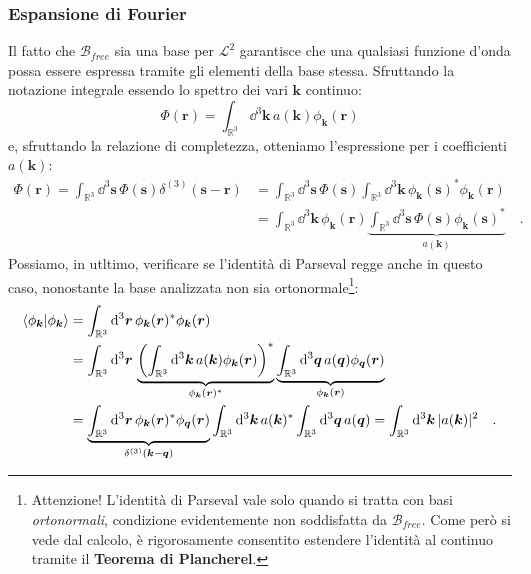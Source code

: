 \subsubsection{Espansione di Fourier}
Il fatto che $\mathcal{B}_{free}$ sia una base per $\mathcal{L}^2$ garantisce che una qualsiasi funzione d'onda possa essere espressa tramite gli elementi della base stessa. Sfruttando la notazione integrale essendo lo spettro dei vari $\bm{k}$ continuo:
\[
    \Phi(\bm{r}) = \int_{\mathbb{R}^3} \dd^3{\bm{k}} \, a(\bm{k})\phi_{\bm{k}}(\bm{r})
\]
e, sfruttando la relazione di completezza, otteniamo l'espressione per i coefficienti $a(\bm{k})$:
\[
    \begin{aligned}
        \Phi(\bm{r}) = \int_{\mathbb{R}^3} \dd^3{\bm{s}} \, \Phi(\bm{s}) \delta^{(3)}{(\bm{s}-\bm{r})} &= \int_{\mathbb{R}^3} \dd^3{\bm{s}} \, \Phi(\bm{s}) \int_{\mathbb{R}^3} \dd^3{\bm{k}} \, \phi_{\bm{k}}(\bm{s})^*\phi_{\bm{k}}(\bm{r}) \\
        &= \int_{\mathbb{R}^3} \dd^3{\bm{k}} \, \phi_{\bm{k}}(\bm{r}) \underbrace{\int_{\mathbb{R}^3} \dd^3{\bm{s}} \, \Phi(\bm{s}) \phi_{\bm{k}}(\bm{s})^*}_{a(\bm{k})} \quad.
        \end{aligned}
\]
Possiamo, in utltimo, verificare se l'identità di Parseval regge anche in questo caso, nonostante la base analizzata non sia ortonormale\footnote{Attenzione! L'identità di Parseval vale solo quando si tratta con basi \emph{ortonormali}, condizione evidentemente non soddisfatta da $\mathcal{B}_{free}$. Come però si vede dal calcolo, è rigorosamente consentito estendere l'identità al continuo tramite il \textbf{Teorema di Plancherel}.}:
\[
\begin{aligned}
    \braket{\phi_{\bm{k}}}{\phi_{\bm{k}}} &= \int_{\mathbb{R}^3} \dd^3{\bm{r}} \, \phi_{\bm{k}}(\bm{r})^*\phi_{\bm{k}}(\bm{r}) \\
    &= \int_{\mathbb{R}^3} \dd^3{\bm{r}} \, \underbrace{\left(\int_{\mathbb{R}^3} \dd^3{\bm{k}} \, a(\bm{k})\phi_{\bm{k}}(\bm{r})\right)^*}_{\phi_{\bm{k}}(\bm{r})^*} \underbrace{\int_{\mathbb{R}^3} \dd^3{\bm{q}} \, a(\bm{q})\phi_{\bm{q}}(\bm{r})}_{\phi_{\bm{k}}(\bm{r})} \\
    &= \underbrace{\int_{\mathbb{R}^3} \dd^3{\bm{r}} \, \phi_{\bm{k}}(\bm{r})^* \phi_{\bm{q}}(\bm{r})}_{\delta^{(3)}({\bm{k}-\bm{q}})} \int_{\mathbb{R}^3} \dd^3{\bm{k}} \, a(\bm{k})^* \int_{\mathbb{R}^3} \dd^3{\bm{q}} \, a(\bm{q}) = \int_{\mathbb{R}^3} \dd^3{\bm{k}} \, |a(\bm{k})|^2 \quad. \\
\end{aligned}
\]


